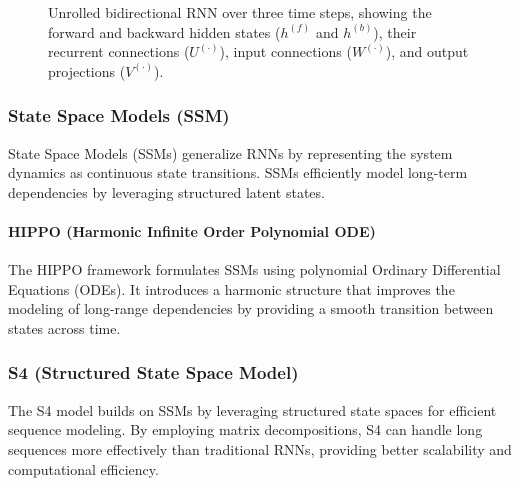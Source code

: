 \documentclass{article}
\begin{document}
\begin{figure}[ht]
\caption{Unrolled bidirectional RNN over three time steps, showing the forward and backward hidden states (\(h^{(f)}\) and \(h^{(b)}\)), their recurrent connections (\(U^{(\cdot)}\)), input connections (\(W^{(\cdot)}\)), and output projections (\(V^{(\cdot)}\)).}
\label{fig:bidirectional-rnn}
\end{figure}


\subsubsection{State Space Models (SSM)}
State Space Models (SSMs) generalize RNNs by representing the system dynamics as continuous state transitions. SSMs efficiently model long-term dependencies by leveraging structured latent states.

\paragraph{HIPPO (Harmonic Infinite Order Polynomial ODE)}
The HIPPO framework formulates SSMs using polynomial Ordinary Differential Equations (ODEs). It introduces a harmonic structure that improves the modeling of long-range dependencies by providing a smooth transition between states across time.

\subsubsection{S4 (Structured State Space Model)}
The S4 model builds on SSMs by leveraging structured state spaces for efficient sequence modeling. By employing matrix decompositions, S4 can handle long sequences more effectively than traditional RNNs, providing better scalability and computational efficiency.
\end{document}
